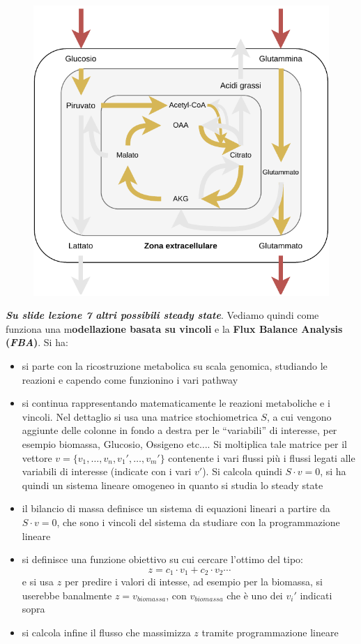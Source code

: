 \documentclass[a4paper,12pt, oneside]{book}
\begin{document}
\begin{figure}[H]
  \centering
  \includegraphics[scale = 0.5]{img/toy4.pdf}
\end{figure}
\textbf{\textit{Su slide lezione 7 altri possibili steady state}}.
\newpage
Vediamo quindi come funziona una m\textbf{odellazione basata su vincoli} e la
\textbf{Flux Balance Analysis (\textit{FBA})}. Si ha:
\begin{itemize}
  \item si parte con la ricostruzione metabolica su scala genomica, studiando le
  reazioni e capendo come funzionino i vari pathway
  \item si continua rappresentando matematicamente le reazioni metaboliche e i
  vincoli. Nel dettaglio si usa una matrice stochiometrica $S$, a cui vengono
  aggiunte delle colonne in fondo a destra per le ``variabili'' di interesse,
  per esempio biomassa, Glucosio, Ossigeno etc$\ldots$. Si moltiplica tale
  matrice per il vettore $v=\{v_1,\ldots, v_n,v_1',\ldots,v_m'\}$ contenente i
  vari flussi più i flussi legati alle variabili di interesse (indicate con i
  vari $v'$). Si calcola quindi $S\cdot v=0$, si ha quindi un
  sistema lineare omogeneo in quanto si studia lo steady state
  \item il bilancio di massa definisce un sistema di equazioni lineari a partire
  da $S\cdot v=0$, che sono i vincoli del sistema da studiare con la
  programmazione lineare
  \item si definisce una funzione obiettivo su cui cercare l'ottimo del tipo:
  \[z=c_1\cdot v_1+c_2\cdot v_2\cdots\]
  e si usa $z$ per predire i valori di intesse, ad esempio per la biomassa, si
  userebbe banalmente $z=v_{biomassa}$, con $v_{biomassa}$ che è uno dei $v_i'$
  indicati sopra
  \item si calcola infine il flusso che massimizza $z$ tramite programmazione
  lineare
\end{itemize}
\end{document}

